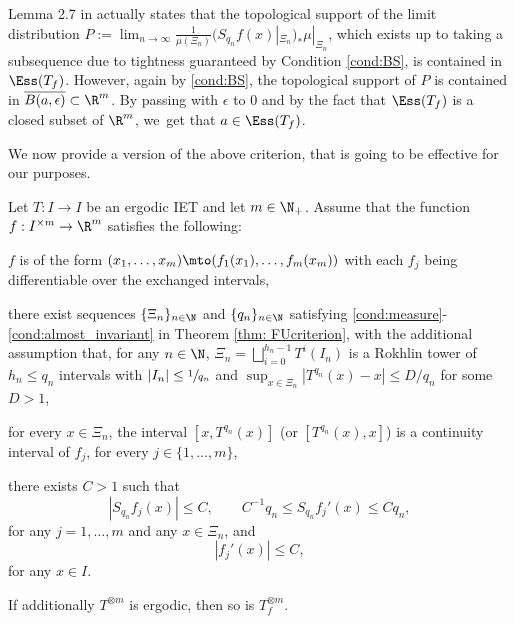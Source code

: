Lemma 2.7 in \cite{conze_cocycles_2011} actually states that
the
topological support of the limit distribution
$P:=\lim_{n\to\infty}\frac{1}{\mu(\Xi_n)}(S_{q_n}f(x)|_{\Xi_n})_*\mu|_{\Xi_n}$,
which exists up
to taking a subsequence due to tightness guaranteed by Condition
\eqref{cond:BS}, is contained in $\Ess(T_f)$. However, again by \eqref{cond:BS},
the topological support of $P$ is contained in $\overline{B(a,\epsilon)}\subset \R^m$. By
passing with $\epsilon$ to 0 and by the fact that $\Ess(T_f)$ is a closed subset
of $\R^m$, we~get that $a\in \Ess(T_f)$.

We now provide a version of the above criterion, that is going to be effective for our purposes.

\begin{proposition}\label{prop: effcriterion}
Let $T:I\to I$ be an ergodic IET and let $m\in \N_+$. Assume that the function $f:I^{\times m}\to \R^{m}$ satisfies the following:
\begin{enumeratei}
\item \label{cond:continuity} $f$ is of the form $(x_1,\ldots,x_m)\mto (f_1(x_1),\ldots,f_m(x_m))$ with each $f_j$ being differentiable over the exchanged intervals,
\item \label{cond:sequences} there exist sequences $\{\Xi_n\}_{n\in\N}$ and $\{q_n\}_{n\in\N}$ satisfying \eqref{cond:measure}-\eqref{cond:almost_invariant} in Theorem \ref{thm: FUcriterion}, with the additional assumption that, for any $n \in \N$, $\Xi_n=\bigsqcup_{i=0}^{h_n-1}T^{i}({I_n})$ is a Rokhlin tower of $h_n\le q_n$ intervals with $|I_n|\le\sfrac{1}{q_n}$ and $\sup_{x\in \Xi_n}|T^{q_n}(x)-x|\le D/q_n$ for some $D>1$,
\item \label{cond:cont_interval} for every $x\in\Xi_n$, the interval $[x,T^{q_n}(x)]$ (or $[T^{q_n}(x),x]$) is a continuity interval of $f_j$, for every $j\in\{1,\ldots,m\}$,
\item \label{cond:derivative} there exists $C>1$ such that
\[
|S_{q_n}f_j(x)|\le C, \qquad C^{-1}q_n\le S_{q_n}f_j'(x)\le Cq_n,
\]
for any $j=1,\ldots,m$ and any $x\in\Xi_n$, and
\[
|f_j'(x)|\le C,
\]
for any $x\in I$.
\end{enumeratei}
If additionally $T^{\otimes m}$ is ergodic, then so is $T_f^{\otimes m}$.
\end{proposition}

